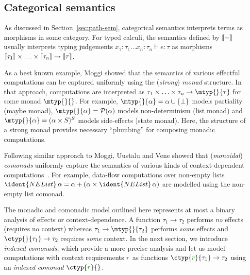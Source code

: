 
\subsection{Categorical semantics}

As discussed in Section~\ref{sec:path-sem}, categorical semantics interprets terms as morphisms
in some category. For typed calculi, the semantics defined by $\llbracket - \rrbracket$ usually interprets typing 
judgements $x_1 \!:\! \tau_1 \ldots x_n \!:\! \tau_n \vdash e: \tau$ as morphisms 
$\llbracket \tau_1 \rrbracket \times \ldots \times \llbracket \tau_n \rrbracket \rightarrow \llbracket \tau \rrbracket$.

As a best known example, Moggi \cite{monad-notions} showed that the semantics of various effectful 
computations can be captured uniformly using the (\emph{strong}) \emph{monad} structure. In that 
approach, computations are interpreted as $\tau_1 \times \ldots \times \tau_n \rightarrow \mtyp{}{\tau}$
for some monad $\mtyp{}{}$. For example, $\mtyp{}{\alpha} = \alpha \cup \{ \bot \}$ models 
partiality (maybe monad), $\mtyp{}{\alpha} = \mathcal{P}(\alpha)$ models non-determinism (list 
monad) and $\mtyp{}{\alpha} = (\alpha \times S)^S$ models side-effects (state monad). Here, the 
structure of a strong monad provides necessary ``plumbing'' for composing monadic computations.

Following similar approach to Moggi, Uustalu and Vene \cite{comonads-notions} showed that 
(\emph{monoidal}) \emph{comonads} uniformly capture the semantics of various kinds of context-dependent 
computations~\cite{comonads-notions}. For example, data-flow computations over non-empty lists
$\ident{NEList}\,\alpha = \alpha + (\alpha \times \ident{NEList}\,\alpha)$ are modelled using
the non-empty list comonad.

The monadic and comonadic model outlined here represents at most a binary analysis of effects or 
context-dependence. A function $\tau_1 \rightarrow \tau_2$ performs \emph{no} effects (requires no 
context) whereas $\tau_1 \rightarrow \mtyp{}{\tau_2}$ performs \emph{some} effects and
$\ctyp{}{\tau_1} \rightarrow \tau_2$ requires \emph{some} context. In the next section, we introduce
\emph{indexed comonads}, which provide a more precise analysis and let us model computations with
context requirements $\cclrd{r}$ as functions $\ctyp{\cclrd{r}}{\tau_1} \rightarrow \tau_2$ using
an \emph{indexed comonad} $\ctyp{\cclrd{r}}{}$.

